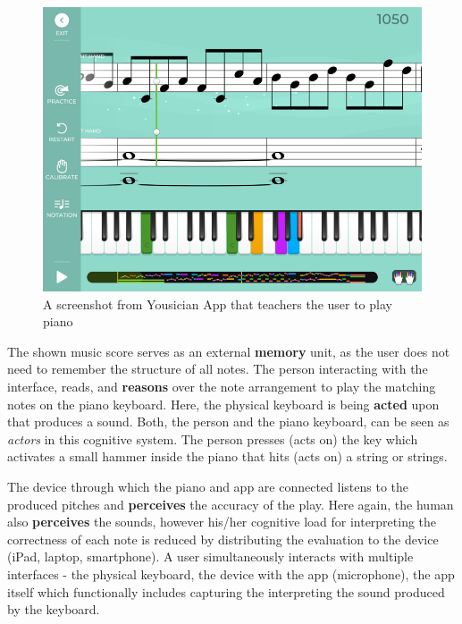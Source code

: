 \documentclass[12pt,letterpaper]{article}
\begin{document}
\begin{figure}[h]
\centering
\includegraphics[scale=.35]{figures/p3/yousician.png}
\caption{A screenshot from Yousician App that teachers the user to play piano}
\label{fig::2}
\end{figure}

The shown music score serves as an external \textbf{memory} unit, as the user does not need to remember the structure of all notes. The person interacting with the interface, reads, and \textbf{reasons} over the note arrangement to play the matching notes on the piano keyboard. Here, the physical keyboard is being \textbf{acted} upon that produces a sound. Both, the person and the piano keyboard, can be seen as \textit{actors} in this cognitive system. The person presses (acts on) the key which activates a small hammer inside the piano that hits (acts on) a string or strings. 

The device through which the piano and app are connected listens to the produced pitches and \textbf{perceives} the accuracy of the play. Here again, the human also \textbf{perceives} the sounds, however his/her cognitive load for interpreting the correctness of each note is reduced by distributing the evaluation to the device (iPad, laptop, smartphone).  A user simultaneously interacts with multiple interfaces - the physical keyboard, the device with the app (microphone), the app itself which functionally includes capturing the interpreting the sound produced by the keyboard. 
\end{document}
